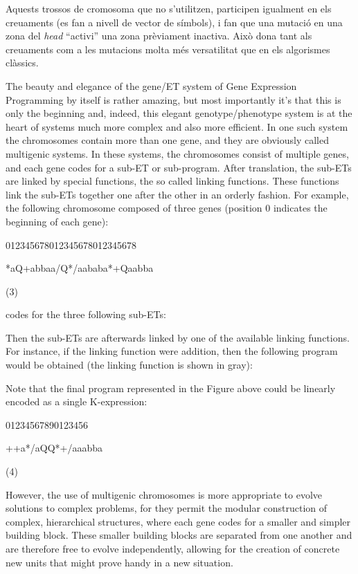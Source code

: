 \documentclass[titlepage,a4paper,12pt]{book}
\begin{document}
Aquests trossos de cromosoma que no s'utilitzen, participen igualment en els
creuaments (es fan a nivell de vector de símbols), i fan que una mutació en una
zona del \emph{head} ``activi'' una zona prèviament inactiva.  Això dona tant
als creuaments com a les mutacions molta més versatilitat que en els algorismes
clàssics.

The beauty and elegance of the gene/ET system of Gene Expression Programming by itself is rather amazing, but most importantly it's that this is only the beginning and, indeed, this elegant genotype/phenotype system is at the heart of systems much more complex and also more efficient. In one such system the chromosomes contain more than one gene, and they are obviously called multigenic systems. In these systems, the chromosomes consist of multiple genes, and each gene codes for a sub-ET or sub-program. After translation, the sub-ETs are linked by special functions, the so called linking functions. These functions link the sub-ETs together one after the other in an orderly fashion. For example, the following chromosome composed of three genes (position 0 indicates the beginning of each gene):

012345678012345678012345678 	 

*aQ+abbaa/Q*/aababa*+Qaabba
	

(3)

codes for the three following sub-ETs:

Then the sub-ETs are afterwards linked by one of the available linking functions. For instance, if the linking function were addition, then the following program would be obtained (the linking function is shown in gray):

Note that the final program represented in the Figure above could be linearly encoded as a single K-expression:

01234567890123456 	 

++a*/aQQ*+/aaabba
	

(4)

However, the use of multigenic chromosomes is more appropriate to evolve solutions to complex problems, for they permit the modular construction of complex, hierarchical structures, where each gene codes for a smaller and simpler building block. These smaller building blocks are separated from one another and are therefore free to evolve independently, allowing for the creation of concrete new units that might prove handy in a new situation.
\end{document}
